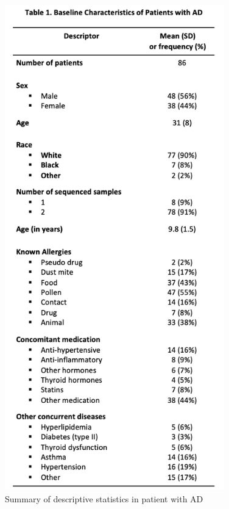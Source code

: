 \documentclass[journal, a4paper]{IEEEtran}
\begin{document}
\begin{figure}[!htp]
    \begin{center}
    \begin{minipage}{0.5 \textwidth}
      \centering
      \includegraphics[width=0.85\textwidth]{table1.png}
      \caption{Summary of descriptive statistics in patient with AD}
      \label{fig:table1}
    \end{minipage}
  \end{center}
\end{figure}
\end{document}
